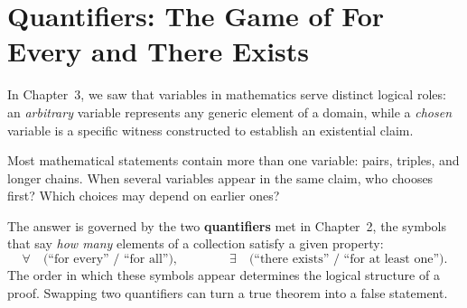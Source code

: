 \section{Quantifiers: The Game of For Every and There Exists}
\chapterline

In Chapter~3, we saw that variables in mathematics serve distinct logical roles: an \emph{arbitrary} variable represents any generic element of a domain, while a \emph{chosen} variable is a specific witness constructed to establish an existential claim.

Most mathematical statements contain more than one variable: pairs, triples, and longer chains. When several variables appear in the same claim, who chooses first? Which choices may depend on earlier ones?

The answer is governed by the two \textbf{quantifiers} met in Chapter~2, the symbols that say \emph{how many} elements of a collection satisfy a given property:
\[
\forall \quad \text{(``for every'' / ``for all'')}, \qquad\qquad \exists \quad \text{(``there exists'' / ``for at least one'')}.
\]
The order in which these symbols appear determines the logical structure of a proof. Swapping two quantifiers can turn a true theorem into a false statement.

